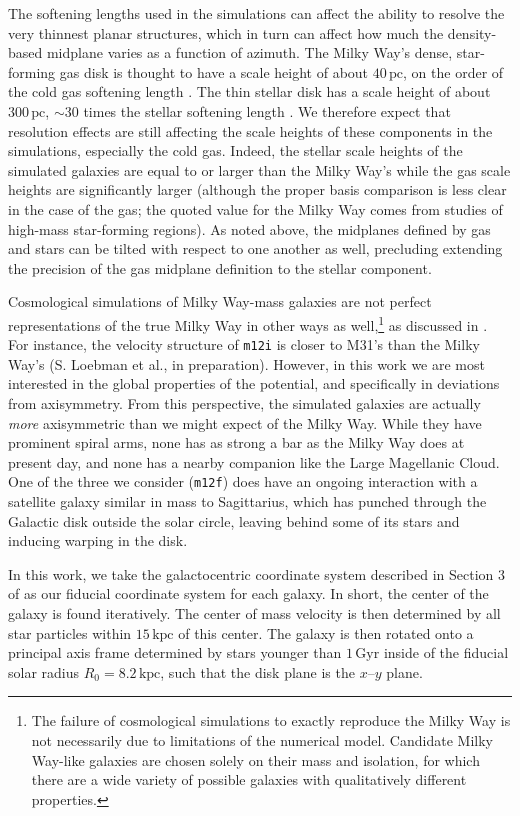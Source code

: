 \documentclass[twocolumn]{aastex62}
\newcommand{\pc}{\text{pc}}
\newcommand{\kpc}{\text{kpc}}
\newcommand{\Gyr}{\text{Gyr}}
\newcommand{\mi}{\texttt{m12i}}
\newcommand{\mf}{\texttt{m12f}}
\begin{document}
The softening lengths used in the simulations can affect the ability to
resolve the very thinnest planar structures, which in turn can affect how much
the density-based midplane varies as a function of azimuth. The Milky Way's
dense, star-forming gas disk is thought to have a scale height of about
$40\,\pc$, on the order of the cold gas softening length
\citep{2019ApJ...871..145A}. The thin stellar disk has a scale height of about
$300\,\pc$, $\sim30$ times the stellar softening length
\citep{2008ApJ...673..864J}. We therefore expect that resolution effects are
still affecting the scale heights of these components in the simulations,
especially the cold gas. Indeed, the stellar scale heights of the simulated
galaxies are equal to or larger than the Milky Way's while the gas scale
heights are significantly larger (although the proper basis comparison is less
clear in the case of the gas; the quoted value for the Milky Way comes from
studies of high-mass star-forming regions). As noted above, the midplanes
defined by gas and stars can be tilted with respect to one another as well,
precluding extending the precision of the gas midplane definition to the
stellar component.

Cosmological simulations of Milky Way-mass galaxies are not perfect
representations of the true Milky Way in other ways as well,\footnote{The
failure of cosmological simulations to exactly reproduce the Milky Way is not necessarily due to limitations of the numerical model. Candidate Milky Way-like
galaxies are chosen solely on their mass and isolation, for which there are a
wide variety of possible galaxies with qualitatively different properties.} as
discussed in \citet{2018arXiv180610564S}. For instance, the velocity structure
of \mi{} is closer to M31's than the Milky Way's (S. Loebman et al., in preparation).
However, in this work we are most interested in the global properties of the
potential, and specifically in deviations from axisymmetry. From this
perspective, the simulated galaxies are actually \emph{more} axisymmetric than
we might expect of the Milky Way. While they have prominent spiral arms, none
has as strong a bar as the Milky Way does at present day, and none has a
nearby companion like the Large Magellanic Cloud. One of the three we consider
(\mf) does have an ongoing interaction with a satellite galaxy similar in mass to
Sagittarius, which has punched through the Galactic disk outside the solar
circle, leaving behind some of its stars and inducing warping in the disk.

In this work, we take the galactocentric coordinate system described in
Section 3 of \citet{2018arXiv180610564S} as our fiducial coordinate system for
each galaxy. In short, the center of the galaxy is found iteratively. The
center of mass velocity is then determined by all star particles within
$15\,\kpc$ of this center. The galaxy is then rotated onto a principal axis
frame determined by stars younger than $1\,\Gyr$ inside of the fiducial solar
radius $R_{0} = 8.2\,\kpc$, such that the disk plane is the $x$--$y$ plane.
\end{document}

